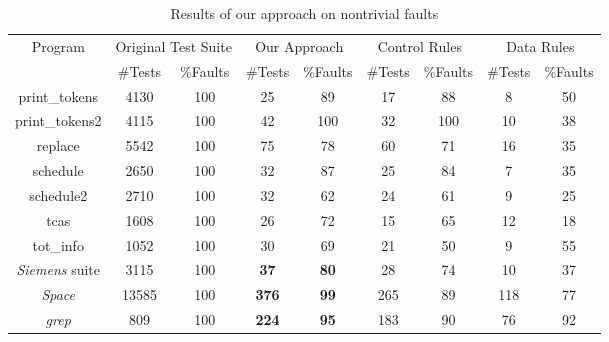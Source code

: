 \documentclass{sig-alternate}
\begin{document}
\begin{table}[htbp]
\caption{Results of our approach on nontrivial
faults}\label{tab:our:nontrivial} \center
\begin{tabular}{|c|c|c|c|c|c|c|c|c|}

\hline Program   & \multicolumn{2}{c}{Original Test Suite} \vline &
\multicolumn{2}{c}{Our Approach} \vline
& \multicolumn{2}{c}{Control Rules} \vline & \multicolumn{2}{c}{Data Rules} \vline   \\

\cline{2-9}  & \#Tests &   \%Faults & \#Tests &   \%Faults &
\#Tests &   \%Faults & \#Tests &   \%Faults \\
\hline  print\_tokens   &   4130    &   100 &   25  &   89  &   17  &   88  &   8   &   50  \\
\hline  print\_tokens2  &   4115    &   100 &   42  &   100 &   32  &   100 &   10  &   38  \\
\hline  replace &   5542    &   100 &   75  &   78  &   60  &   71  &   16  &   35  \\
\hline  schedule    &   2650    &   100 &   32  &   87  &   25  &   84  &   7   &   35  \\
\hline  schedule2   &   2710    &   100 &   32  &   62  &   24  &   61  &   9   &   25  \\
\hline  tcas    &   1608    &   100 &   26  &   72  &   15  &   65  &   12  &   18  \\
\hline  tot\_info &   1052    &   100 &   30  &   69  &   21  &   50  &   9   &   55  \\
\hline  \emph{Siemens} suite   &   3115    &   100 &   \textbf{37}  &   \textbf{80}  &   28  &   74  &   10  &   37  \\
\hline  \emph{Space}   &   13585   &   100 &   \textbf{376} &   \textbf{99}  &   265 &   89  &   118 &   77  \\
\hline  \emph{grep}    &   809 &   100 &   \textbf{224} &   \textbf{95}  &   183 &   90  &   76  &   92  \\

\hline
\end{tabular}
\end{table}
\end{document}
